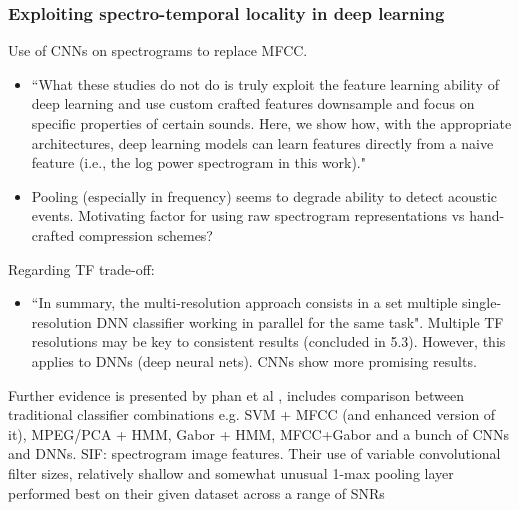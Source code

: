 \documentclass[12pt]{llncs}
\begin{document}
\subsubsection*{Exploiting spectro-temporal locality in deep learning \cite{espi2015exploiting}}
Use of CNNs on spectrograms to replace MFCC.
\begin{itemize}
	\item  ``What these studies do not do is truly exploit the feature learning ability of deep learning and use custom crafted features downsample and focus on specific properties of certain sounds. Here, we show how, with the appropriate architectures, deep learning models can learn features directly from a naive feature (i.e., the log power spectrogram in this work)."
	\item Pooling (especially in frequency) seems to degrade ability to detect acoustic events. Motivating factor for using raw spectrogram representations vs hand-crafted compression schemes?
\end{itemize}
Regarding TF trade-off:
\begin{itemize}
	\item ``In summary, the multi-resolution approach consists in a set multiple single-resolution DNN classifier working in parallel for the same task". Multiple TF resolutions may be key to consistent results (concluded in 5.3). However, this applies to DNNs (deep neural nets). CNNs show more promising results.
\end{itemize}

Further evidence is presented by phan et al \cite{phan2016robust}, includes comparison between traditional classifier combinations e.g. SVM + MFCC (and enhanced version of it), MPEG/PCA + HMM, Gabor + HMM, MFCC+Gabor and a bunch of CNNs and DNNs. SIF: spectrogram image features. Their use of variable convolutional filter sizes, relatively shallow and somewhat unusual 1-max pooling layer performed best on their given dataset across a range of SNRs
\end{document}
